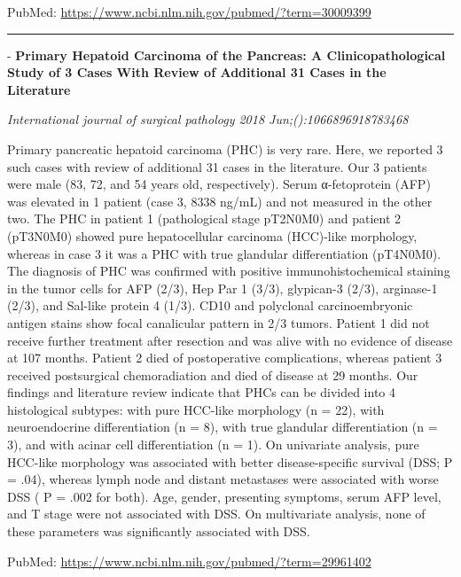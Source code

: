 \documentclass[]{article}
\begin{document}
PubMed: \url{https://www.ncbi.nlm.nih.gov/pubmed/?term=30009399}

{}

{}

\begin{center}\rule{0.5\linewidth}{\linethickness}\end{center}

 - \textbf{Primary Hepatoid Carcinoma of the Pancreas: A
Clinicopathological Study of 3 Cases With Review of Additional 31 Cases
in the Literature}

\emph{International journal of surgical pathology 2018
Jun;():1066896918783468}

Primary pancreatic hepatoid carcinoma (PHC) is very rare. Here, we
reported 3 such cases with review of additional 31 cases in the
literature. Our 3 patients were male (83, 72, and 54 years old,
respectively). Serum α-fetoprotein (AFP) was elevated in 1 patient (case
3, 8338 ng/mL) and not measured in the other two. The PHC in patient 1
(pathological stage pT2N0M0) and patient 2 (pT3N0M0) showed pure
hepatocellular carcinoma (HCC)-like morphology, whereas in case 3 it was
a PHC with true glandular differentiation (pT4N0M0). The diagnosis of
PHC was confirmed with positive immunohistochemical staining in the
tumor cells for AFP (2/3), Hep Par 1 (3/3), glypican-3 (2/3), arginase-1
(2/3), and Sal-like protein 4 (1/3). CD10 and polyclonal
carcinoembryonic antigen stains show focal canalicular pattern in 2/3
tumors. Patient 1 did not receive further treatment after resection and
was alive with no evidence of disease at 107 months. Patient 2 died of
postoperative complications, whereas patient 3 received postsurgical
chemoradiation and died of disease at 29 months. Our findings and
literature review indicate that PHCs can be divided into 4 histological
subtypes: with pure HCC-like morphology (n = 22), with neuroendocrine
differentiation (n = 8), with true glandular differentiation (n = 3),
and with acinar cell differentiation (n = 1). On univariate analysis,
pure HCC-like morphology was associated with better disease-specific
survival (DSS; P = .04), whereas lymph node and distant metastases were
associated with worse DSS ( P = .002 for both). Age, gender, presenting
symptoms, serum AFP level, and T stage were not associated with DSS. On
multivariate analysis, none of these parameters was significantly
associated with DSS.

PubMed: \url{https://www.ncbi.nlm.nih.gov/pubmed/?term=29961402}

{}
\end{document}
